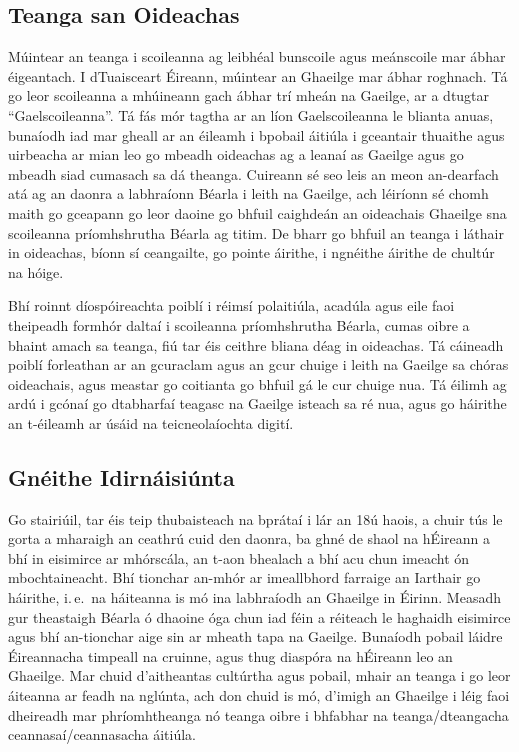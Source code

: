 \begin{multicols}{2}
\subsection{Teanga san Oideachas}

Múintear an teanga i scoileanna ag leibhéal bunscoile agus meánscoile mar ábhar éigeantach. I dTuaisceart Éireann, múintear an Ghaeilge mar ábhar roghnach. Tá go leor scoileanna a mhúineann gach ábhar trí mheán na Gaeilge, ar a dtugtar “Gaelscoileanna”. Tá fás mór tagtha ar an líon Gaelscoileanna le blianta anuas, bunaíodh iad mar gheall ar an éileamh i bpobail áitiúla i gceantair thuaithe agus uirbeacha ar mian leo go mbeadh oideachas ag a leanaí as Gaeilge agus go mbeadh siad cumasach sa dá theanga. Cuireann sé seo leis an meon an-dearfach atá ag an daonra a labhraíonn Béarla i leith na Gaeilge, ach léiríonn sé chomh maith go gceapann go leor daoine go bhfuil caighdeán an oideachais Ghaeilge sna scoileanna príomhshrutha Béarla ag titim. De bharr go bhfuil an teanga i láthair in oideachas, bíonn sí ceangailte, go pointe áirithe, i ngnéithe áirithe de chultúr na hóige. 

Bhí roinnt díospóireachta poiblí i réimsí polaitiúla, acadúla agus eile faoi theipeadh formhór daltaí i scoileanna príomhshrutha Béarla, cumas oibre a bhaint amach sa teanga, fiú tar éis ceithre bliana déag in oideachas. Tá cáineadh poiblí forleathan ar an gcuraclam agus an gcur chuige i leith na Gaeilge sa chóras oideachais, agus meastar go coitianta go bhfuil gá le cur chuige nua. Tá éilimh ag ardú i gcónaí go dtabharfaí teagasc na Gaeilge isteach sa ré nua, agus go háirithe an t-éileamh ar úsáid na teicneolaíochta digití.

\subsection{Gnéithe Idirnáisiúnta}

Go stairiúil, tar éis teip thubaisteach na bprátaí i lár an 18ú haois, a chuir tús le gorta a mharaigh an ceathrú cuid den daonra, ba ghné de shaol na hÉireann a bhí in eisimirce ar mhórscála, an t-aon bhealach a bhí acu chun imeacht ón mbochtaineacht. Bhí tionchar an-mhór ar imeallbhord farraige an Iarthair go háirithe, i.\,e.~na háiteanna is mó ina labhraíodh an Ghaeilge in Éirinn.  Measadh gur theastaigh Béarla ó dhaoine óga chun iad féin a réiteach le haghaidh eisimirce agus bhí an-tionchar aige sin ar mheath tapa na Gaeilge. Bunaíodh pobail láidre Éireannacha timpeall na cruinne, agus thug diaspóra na hÉireann leo an Ghaeilge. Mar chuid d’aitheantas cultúrtha agus pobail, mhair an teanga i go leor áiteanna ar feadh na nglúnta, ach don chuid is mó, d’imigh an Ghaeilge i léig faoi dheireadh mar phríomhtheanga nó teanga oibre i bhfabhar na teanga/dteangacha ceannasaí/ceannasacha áitiúla. 


\end{multicols}
